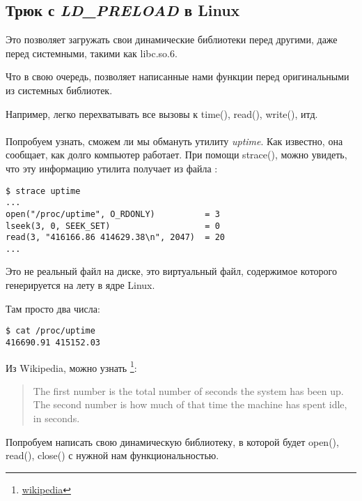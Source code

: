 \subsection{Трюк с \emph{LD\_PRELOAD} в Linux}

\label{ld_preload}

Это позволяет загружать свои динамические библиотеки перед другими, даже перед системными, такими как libc.so.6.

Что в свою очередь, позволяет  написанные нами функции перед оригинальными из системных библиотек.

Например, легко перехватывать все вызовы к time(), read(), write(), итд. \\
\\
Попробуем узнать, сможем ли мы обмануть утилиту \emph{uptime}.
Как известно, она сообщает, как долго компьютер работает.
При помощи strace(), можно увидеть, что эту информацию утилита получает из файла :

\begin{lstlisting}
$ strace uptime 
...
open("/proc/uptime", O_RDONLY)          = 3
lseek(3, 0, SEEK_SET)                   = 0
read(3, "416166.86 414629.38\n", 2047)  = 20
...
\end{lstlisting}

Это не реальный файл на диске, это виртуальный файл, содержимое которого генерируется на лету в ядре Linux.

Там просто два числа:

\begin{lstlisting}
$ cat /proc/uptime
416690.91 415152.03
\end{lstlisting}

Из Wikipedia, можно узнать
\footnote{\href{http://go.yurichev.com/17043}{wikipedia}}:

\begin{framed}
\begin{quotation}
The first number is the total number of seconds the system has been up.
The second number is how much of that time the machine has spent idle, in seconds.
\end{quotation}
\end{framed}

Попробуем написать свою динамическую библиотеку, в которой будет open(), read(), close() с нужной нам функциональностью.

